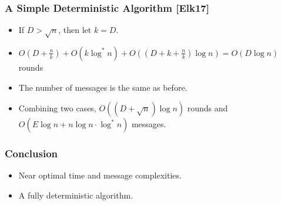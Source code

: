 \begin{frame}
\frametitle{A Simple Deterministic Algorithm [Elk17]}
\begin{itemize}
    \item If $D > \sqrt{n}$, then let $k=D$.
    \item $O(D+\frac{n}{k}) + O(k\log^* n) + O((D + k + \frac{n}{k})\log n) = O(D\log n)$ rounds
    \item The number of messages is the same as before.
    \item Combining two cases, $O((D + \sqrt{n})\log n)$ rounds and $O(E \log n + n\log n \cdot \log^* n)$ messages.
\end{itemize}
\end{frame}


\begin{frame}
\frametitle{Conclusion}
\begin{itemize}
    \item Near optimal time and message complexities.
    \item A fully deterministic algorithm.
\end{itemize}


\end{frame}
